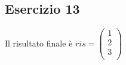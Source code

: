 \subsection{Esercizio 13}

Il risultato finale è $ ris =\left(\begin{array}{c}
    1 \\
    2 \\
    3 \\
\end{array}\right)$  
